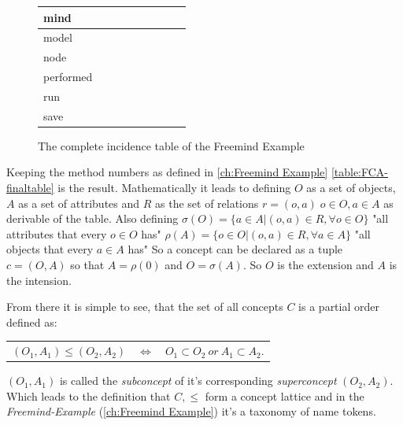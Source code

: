 \begin{figure}
\begin{tabular}{| l | c | c | c | c | c | c | c | c |}
      mind 		& \checkmark	& \checkmark & \checkmark  & \checkmark & \checkmark & \checkmark  & \checkmark & \checkmark \\ \hline
      model 		& \checkmark	& \checkmark & \checkmark  & \checkmark & \checkmark & \checkmark  & \checkmark & \checkmark \\ \hline
      node 		&			    	&                    &                     &                    &                    & \checkmark  & \checkmark &                     \\ \hline
      performed 	&			    	&                    &                     &                    &                    &                     &                    & \checkmark  \\ \hline
      run 			& \checkmark 	&                    &                     &                    &                    &                     &                    &                     \\ \hline
      save 		& \checkmark	& \checkmark & \checkmark  &			     & \checkmark & \checkmark  & \checkmark &				 \\ \hline
    \end{tabular}
     \caption{The complete incidence table of the Freemind Example}
     \label{table:FCA-finaltable}
     \vspace{-1em}
\end{figure}
Keeping the method numbers as defined in \autoref{ch:Freemind Example}  \autoref{table:FCA-finaltable} is the result. Mathematically it leads to defining $O$ as a set of objects, $A$ as a set of attributes and $R$ as the set of relations $r = (o,a) \; o\in O,a\in A$ as derivable of the table. Also defining \newline
$\sigma(O) = \{a \in A | (o,a) \in R, \forall o \in O \}$  \quad "all attributes that every $o\in O$ has" \newline
 $\rho(A)= \{o\in O|(o,a)\in R, \forall a\in A \}$  \quad "all objects that every $a\in A$ has" \newline
So a concept can be declared as a tuple $c=(O,A)$ so that $A=\rho(0)$ and $O=\sigma(A)$. So $O$ is the extension and $A$ is the intension.

From there it is simple to see, that the set of all concepts $C$ is a partial order defined as: \newline
\begin{center}
  \vspace{-2em}
  \begin{tabular}{ r c l }
  $ (O_1,A_1) \le (O_2, A_2)$ & $\Leftrightarrow$ & $O_1 \subset O_2 \ or \ A_1 \subset A_2$. \\
  \end{tabular}
\end{center}
\vspace{-1em}
$(O_1,A_1)$ is called the \emph{subconcept} of it's corresponding \emph{superconcept} $(O_2,A_2)$. \newline
Which leads to the definition that $C, \le$ form a concept lattice and in the \textit{Freemind-Example} (\autoref{ch:Freemind Example}) it's a taxonomy of name tokens. 
